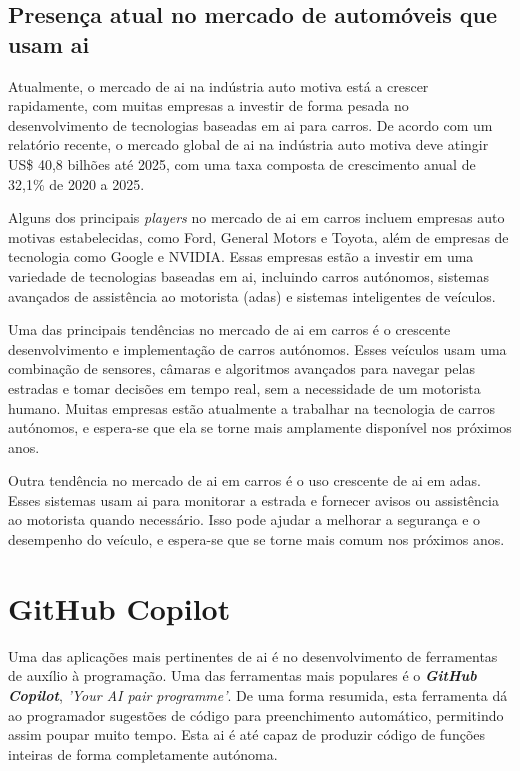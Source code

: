 \documentclass{report}
\begin{document}
\section{Presença atual no mercado de automóveis que usam \ac{ai}}

Atualmente, o mercado de \ac{ai} na indústria auto motiva está a crescer rapidamente, com muitas empresas a investir de forma pesada no desenvolvimento de tecnologias baseadas em \ac{ai} para carros. De acordo com um relatório recente, o mercado global de \ac{ai} na indústria auto motiva deve atingir US\$ 40,8 bilhões até 2025, com uma taxa composta de crescimento anual de 32,1\% de 2020 a 2025. \cite{aicarros}

Alguns dos principais \textit{players} no mercado de \ac{ai} em carros incluem empresas auto motivas estabelecidas, como Ford, General Motors e Toyota, além de empresas de tecnologia como Google e NVIDIA. Essas empresas estão a investir em uma variedade de tecnologias baseadas em \ac{ai}, incluindo carros autónomos, sistemas avançados de assistência ao motorista (\ac{adas}) e sistemas inteligentes de veículos.

Uma das principais tendências no mercado de \ac{ai} em carros é o crescente desenvolvimento e implementação de carros autónomos. Esses veículos usam uma combinação de sensores, câmaras e algoritmos avançados para navegar pelas estradas e tomar decisões em tempo real, sem a necessidade de um motorista humano. Muitas empresas estão atualmente a trabalhar na tecnologia de carros autónomos, e espera-se que ela se torne mais amplamente disponível nos próximos anos.

Outra tendência no mercado de \ac{ai} em carros é o uso crescente de \ac{ai} em \ac{adas}. Esses sistemas usam \ac{ai} para monitorar a estrada e fornecer avisos ou assistência ao motorista quando necessário. Isso pode ajudar a melhorar a segurança e o desempenho do veículo, e espera-se que se torne mais comum nos próximos anos.

\chapter{GitHub Copilot}
\label{chap.github}
Uma das aplicações mais pertinentes de \ac{ai} é no desenvolvimento de ferramentas de auxílio à programação. Uma das ferramentas mais populares é o \textbf{\textit{GitHub Copilot}}, \textit{'Your AI pair programme'}. De uma forma resumida, esta ferramenta dá ao programador sugestões de código para preenchimento automático, permitindo assim poupar muito tempo. Esta \ac{ai} é até capaz de produzir código de funções inteiras de forma completamente autónoma.
\end{document}
